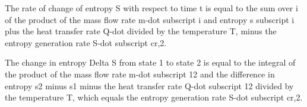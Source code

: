The rate of change of entropy S with respect to time t is equal to the sum over i of the product of the mass flow rate m-dot subscript i and entropy s subscript i plus the heat transfer rate Q-dot divided by the temperature T, minus the entropy generation rate S-dot subscript cr,2.

The change in entropy Delta S from state 1 to state 2 is equal to the integral of the product of the mass flow rate m-dot subscript 12 and the difference in entropy s2 minus s1 minus the heat transfer rate Q-dot subscript 12 divided by the temperature T, which equals the entropy generation rate S-dot subscript cr,2.
